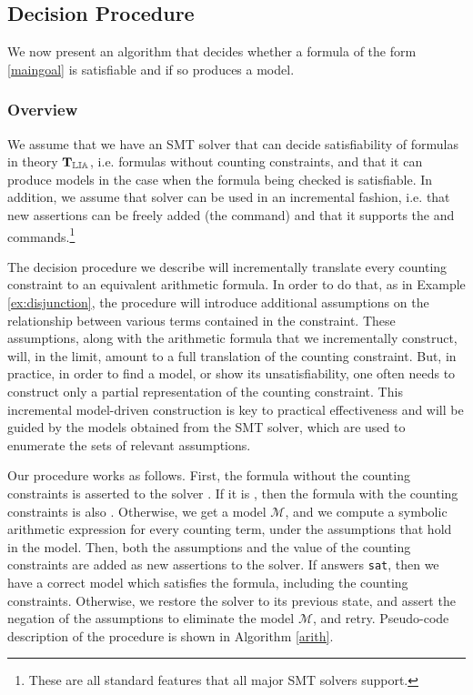 \subsection{Decision Procedure}

We now present an algorithm that decides whether a formula of the form
\ref{maingoal} is satisfiable and if so produces a model.

\subsubsection{Overview}

We assume that we have an SMT solver \solver that can decide
satisfiability of formulas in theory $\operatorname{\mathbf{T}_{\mathbb{LIA}}}$, i.e. formulas without
counting constraints, and that it can produce models in the case when
the formula being checked is satisfiable. In addition, we assume that
solver \solver can be used in an incremental fashion, i.e. that new
assertions can be freely added (the \assert command) and that it
supports the \push and \pop commands.\footnote{These are all standard
features that all major SMT solvers support.}

The decision procedure we describe will incrementally translate every
counting constraint to an equivalent arithmetic formula. In order to
do that, as in Example \ref{ex:disjunction}, the procedure will
introduce additional assumptions on the relationship between various
terms contained in the constraint. These assumptions, along with the
arithmetic formula that we incrementally construct, will, in the
limit, amount to a full translation of the counting constraint. But,
in practice, in order to find a model, or show its unsatisfiability,
one often needs to construct only a partial representation of the
counting constraint. This incremental model-driven construction is key
to practical effectiveness and will be guided by the models obtained
from the SMT solver, which are used to enumerate the sets of relevant
assumptions.

Our procedure works as follows. First, the formula without the
counting constraints is asserted to the solver \solver. If it is
\unsat, then the formula with the counting constraints is also
\sat. Otherwise, we get a model $\mathcal{M}$, and we
compute a symbolic arithmetic expression for every counting term,
under the assumptions that hold in the model. Then, both the
assumptions and the value of the counting constraints are added as new
assertions to the solver. If \solver answers \texttt{sat}, then we
have a correct model which satisfies the formula, including the
counting constraints. Otherwise, we restore the solver to its previous
state, and assert the negation of the assumptions to eliminate the
model $\mathcal{M}$, and retry. Pseudo-code description of the
procedure is shown in Algorithm \ref{arith}.

